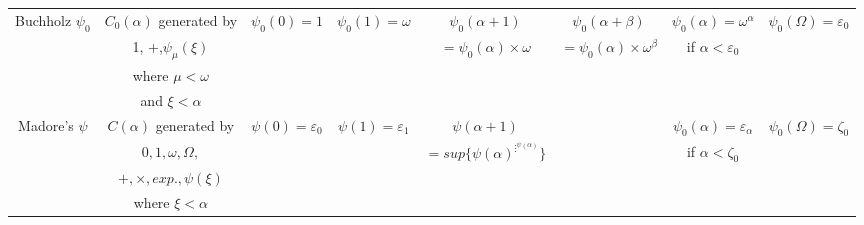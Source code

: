 \documentclass[10pt]{article}
\begin{document}
\begin{tabular}{|c|c|c|c|c|c|c|c|} \hline

Buchholz \(\psi_0\)& \(C_0(\alpha)\) generated by & \(\psi_0(0)=1\)         & \(\psi_0(1)=\omega\)    & \(\psi_0(\alpha+1)\)           &\(\psi_0(\alpha+\beta)\)             & \(\psi_0(\alpha)=\omega^\alpha\)    &\(\psi_0(\Omega)=\varepsilon_0\)\\
                   & 1, +,\(\psi_\mu(\xi)\)       &                         &                         & \(=\psi_0(\alpha)\times\omega\)&\(=\psi_0(\alpha)\times\omega^\beta\)& if \(\alpha<\varepsilon_0\)         &                                \\
                   & where \( \mu < \omega \)     &                         &                         &                                &                                     &                                     &                                \\
                   & and \( \xi < \alpha \)       &                         &                         &                                &                                     &                                     &                                \\ 
\hline

Madore's \(\psi\)  & \(C(\alpha)\) generated by   &\(\psi(0)=\varepsilon_0\)&\(\psi(1)=\varepsilon_1\)& \(\psi(\alpha+1)\)             &                                     &\(\psi_0(\alpha)=\varepsilon_\alpha\)& \(\psi_0(\Omega)=\zeta_0\)     \\
                   & \(0,1,\omega,\Omega,\)       &                         &                         & \(=sup\lbrace\psi(\alpha)^{\vdots^{\psi(\alpha)}}\rbrace\) 
                                                                                                                                       &                                     & if \(\alpha<\zeta_0\)               &                                \\
                   & \(+,\times,exp.,\psi(\xi)\)  &                         &                         &                                &                                     &                                     &                                \\
                   & where \( \xi < \alpha \)     &                         &                         &                                &                                     &                                     &                                \\
\hline
													
\end{tabular}
\end{document}
